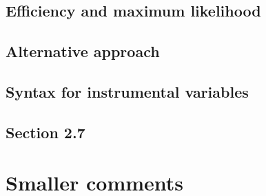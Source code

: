 \documentclass[12pt,english]{scrartcl}
\begin{document}
\subsection{Efficiency and maximum likelihood}
% 

\subsection{Alternative approach}

\subsection{Syntax for instrumental variables}

\subsection{Section 2.7}

\section{Smaller comments}

% 
% 
\end{document}
